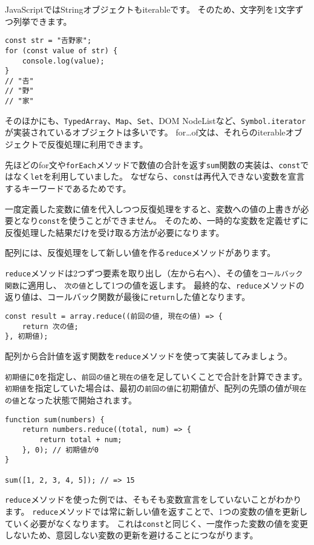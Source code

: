 JavaScriptではStringオブジェクトもiterableです。
そのため、文字列を1文字ずつ列挙できます。

\begin{lstlisting}
const str = "𠮷野家";
for (const value of str) {
    console.log(value);
}
// "𠮷"
// "野"
// "家"
\end{lstlisting}

そのほかにも、\texttt{TypedArray}、\texttt{Map}、\texttt{Set}、DOM
NodeListなど、\texttt{Symbol.iterator}が実装されているオブジェクトは多いです。
for\ldots{}of文は、それらのiterableオブジェクトで反復処理に利用できます。

\begin{tcolorbox}[title=\texttt{let}ではなく\texttt{const}で反復処理をする]\label{const-iteration}

先ほどのfor文や\texttt{forEach}メソッドで数値の合計を返す\texttt{sum}関数の実装は、\texttt{const}ではなく\texttt{let}を利用していました。
なぜなら、\texttt{const}は再代入できない変数を宣言するキーワードであるためです。

一度定義した変数に値を代入しつつ反復処理をすると、変数への値の上書きが必要となり\texttt{const}を使うことができません。
そのため、一時的な変数を定義せずに反復処理した結果だけを受け取る方法が必要になります。

配列には、反復処理をして新しい値を作る\texttt{reduce}メソッドがあります。

\texttt{reduce}メソッドは2つずつ要素を取り出し（左から右へ）、その値を\texttt{コールバック関数}に適用し、
\texttt{次の値}として1つの値を返します。
最終的な、\texttt{reduce}メソッドの返り値は、コールバック関数が最後に\texttt{return}した値となります。

\begin{lstlisting}
const result = array.reduce((前回の値, 現在の値) => {
    return 次の値;
}, 初期値);
\end{lstlisting}

配列から合計値を返す関数を\texttt{reduce}メソッドを使って実装してみましょう。

\texttt{初期値}に\texttt{0}を指定し、\texttt{前回の値}と\texttt{現在の値}を足していくことで合計を計算できます。
\texttt{初期値}を指定していた場合は、最初の\texttt{前回の値}に初期値が、配列の先頭の値が\texttt{現在の値}となった状態で開始されます。

\begin{lstlisting}
function sum(numbers) {
    return numbers.reduce((total, num) => {
        return total + num;
    }, 0); // 初期値が0
}

sum([1, 2, 3, 4, 5]); // => 15
\end{lstlisting}

\texttt{reduce}メソッドを使った例では、そもそも変数宣言をしていないことがわかります。
\texttt{reduce}メソッドでは常に新しい値を返すことで、1つの変数の値を更新していく必要がなくなります。
これは\texttt{const}と同じく、一度作った変数の値を変更しないため、意図しない変数の更新を避けることにつながります。
\end{tcolorbox}
